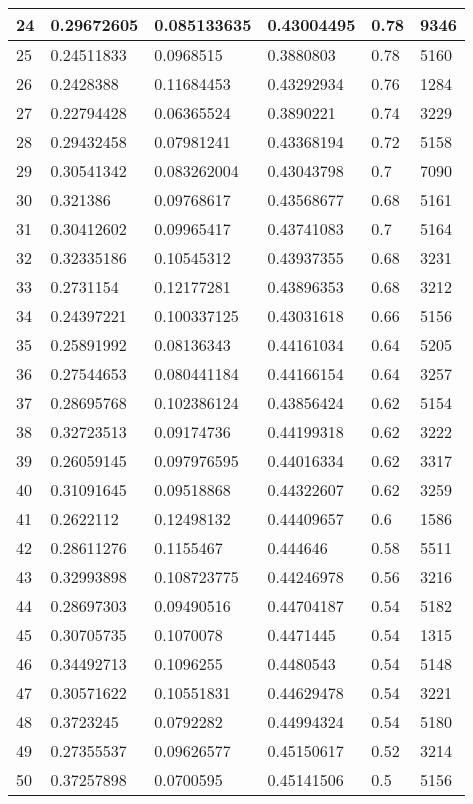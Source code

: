 \begin{longtable}{|l|l|l|l|l|l|}
24 & 0.29672605 & 0.085133635 & 0.43004495 & 0.78 & 9346 \\ \hline 
25 & 0.24511833 & 0.0968515 & 0.3880803 & 0.78 & 5160 \\ \hline 
26 & 0.2428388 & 0.11684453 & 0.43292934 & 0.76 & 1284 \\ \hline 
27 & 0.22794428 & 0.06365524 & 0.3890221 & 0.74 & 3229 \\ \hline 
28 & 0.29432458 & 0.07981241 & 0.43368194 & 0.72 & 5158 \\ \hline 
29 & 0.30541342 & 0.083262004 & 0.43043798 & 0.7 & 7090 \\ \hline 
30 & 0.321386 & 0.09768617 & 0.43568677 & 0.68 & 5161 \\ \hline 
31 & 0.30412602 & 0.09965417 & 0.43741083 & 0.7 & 5164 \\ \hline 
32 & 0.32335186 & 0.10545312 & 0.43937355 & 0.68 & 3231 \\ \hline 
33 & 0.2731154 & 0.12177281 & 0.43896353 & 0.68 & 3212 \\ \hline 
34 & 0.24397221 & 0.100337125 & 0.43031618 & 0.66 & 5156 \\ \hline 
35 & 0.25891992 & 0.08136343 & 0.44161034 & 0.64 & 5205 \\ \hline 
36 & 0.27544653 & 0.080441184 & 0.44166154 & 0.64 & 3257 \\ \hline 
37 & 0.28695768 & 0.102386124 & 0.43856424 & 0.62 & 5154 \\ \hline 
38 & 0.32723513 & 0.09174736 & 0.44199318 & 0.62 & 3222 \\ \hline 
39 & 0.26059145 & 0.097976595 & 0.44016334 & 0.62 & 3317 \\ \hline 
40 & 0.31091645 & 0.09518868 & 0.44322607 & 0.62 & 3259 \\ \hline 
41 & 0.2622112 & 0.12498132 & 0.44409657 & 0.6 & 1586 \\ \hline 
42 & 0.28611276 & 0.1155467 & 0.444646 & 0.58 & 5511 \\ \hline 
43 & 0.32993898 & 0.108723775 & 0.44246978 & 0.56 & 3216 \\ \hline 
44 & 0.28697303 & 0.09490516 & 0.44704187 & 0.54 & 5182 \\ \hline 
45 & 0.30705735 & 0.1070078 & 0.4471445 & 0.54 & 1315 \\ \hline 
46 & 0.34492713 & 0.1096255 & 0.4480543 & 0.54 & 5148 \\ \hline 
47 & 0.30571622 & 0.10551831 & 0.44629478 & 0.54 & 3221 \\ \hline 
48 & 0.3723245 & 0.0792282 & 0.44994324 & 0.54 & 5180 \\ \hline 
49 & 0.27355537 & 0.09626577 & 0.45150617 & 0.52 & 3214 \\ \hline 
50 & 0.37257898 & 0.0700595 & 0.45141506 & 0.5 & 5156 \\ \hline 
\end{longtable}